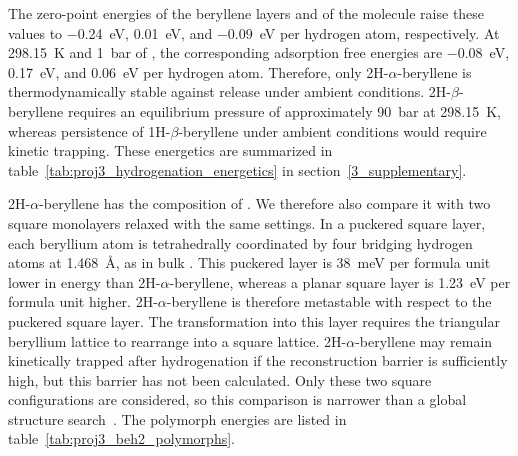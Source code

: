 The zero-point energies of the beryllene layers and of the  molecule raise these values to \qty{-0.24}{\electronvolt},
\qty{0.01}{\electronvolt},
and \qty{-0.09}{\electronvolt} per hydrogen atom,
respectively.
At \qty{298.15}{\kelvin} and \qty{1}{\bar} of ,
the corresponding adsorption free energies are \qty{-0.08}{\electronvolt},
\qty{0.17}{\electronvolt},
and \qty{0.06}{\electronvolt} per hydrogen atom.
Therefore,
only 2H-$\alpha$-beryllene is thermodynamically stable against  release under ambient conditions.
2H-$\beta$-beryllene requires an equilibrium  pressure of approximately \qty{90}{\bar} at \qty{298.15}{\kelvin},
whereas persistence of 1H-$\beta$-beryllene under ambient conditions would require kinetic trapping.
These energetics are summarized in table~\ref{tab:proj3_hydrogenation_energetics} in section~\ref{3_supplementary}.

2H-$\alpha$-beryllene has the composition of .
We therefore also compare it with two square  monolayers relaxed with the same settings.
In a puckered square layer,
each beryllium atom is tetrahedrally coordinated by four bridging hydrogen atoms at \qty{1.468}{\angstrom},
as in bulk .
This puckered layer is \qty{38}{\milli\electronvolt} per formula unit lower in energy than 2H-$\alpha$-beryllene,
whereas a planar square layer is \qty{1.23}{\electronvolt} per formula unit higher.
2H-$\alpha$-beryllene is therefore metastable with respect to the puckered square layer.
The transformation into this layer requires the triangular beryllium lattice to rearrange into a square lattice.
2H-$\alpha$-beryllene may remain kinetically trapped after hydrogenation if the reconstruction barrier is sufficiently high,
but this barrier has not been calculated.
Only these two square configurations are considered,
so this comparison is narrower than a global structure search~\cite{li2018global}.
The polymorph energies are listed in table~\ref{tab:proj3_beh2_polymorphs}.

